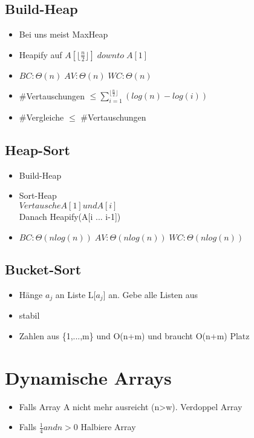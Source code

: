 \documentclass{article}
\begin{document}
\subsection{Build-Heap}
\begin{itemize}
\item Bei uns meist MaxHeap
\item Heapify auf $A[\lfloor \frac{n}{2} \rfloor] \; downto  \;A[1]$
\item $BC: \Theta(n)\; AV:\Theta(n)\; WC: \Theta(n)\;$
\item \#Vertauschungen $\leq \sum_{i=1}^{\lfloor \frac{n}{2} \rfloor} (log(n) -log(i))$
\item \#Vergleiche $\leq$ \#Vertauschungen
\end{itemize}

\subsection{Heap-Sort}
\begin{itemize}
\item Build-Heap
\item Sort-Heap \\
$Vertausche A[1] und A[i]$\\
Danach Heapify(A[i ... i-1])\\
\item $BC: \Theta(nlog(n))\; AV:\Theta(nlog(n))\; WC: \Theta(nlog(n))\;$
\end{itemize}

\subsection{Bucket-Sort}
\begin{itemize}
\item H{\"a}nge $a_j$ an Liste L[$a_j$] an. Gebe alle Listen aus
\item stabil
\item Zahlen aus \{1,...,m\} und O(n+m) und braucht O(n+m) Platz
\end{itemize}

\section{Dynamische Arrays}
\begin{itemize}
\item Falls Array A nicht mehr ausreicht (n>w). Verdoppel Array 
\item Falls $\frac{1}{4} and n>0$ Halbiere Array
\end{itemize}
\end{document}

